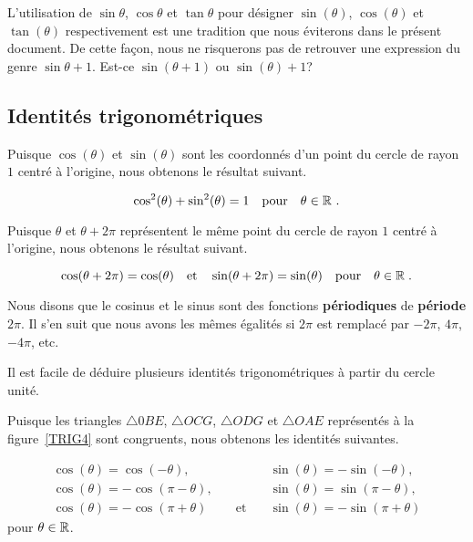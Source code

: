 {\begin{rmk}
L'utilisation de $\sin \theta$, $\cos \theta$ et $\tan \theta$ pour
désigner $\sin(\theta)$, $\cos(\theta)$ et $\tan(\theta)$
respectivement est une tradition que nous éviterons dans le présent
document.  De cette façon, nous ne risquerons pas de retrouver une
expression du genre $\sin \theta + 1$. Est-ce $\sin(\theta+1)$ ou
$\sin(\theta) + 1$?
\end{rmk}

\subsection{Identités trigonométriques}

Puisque $\cos(\theta)$ et $\sin(\theta)$ sont les coordonnés d'un
point du cercle de rayon $1$ centré à l'origine, nous obtenons le
résultat suivant.

\begin{prop}
\[
\cos^2(\theta) + \sin^2(\theta) = 1 \quad \text{pour} \quad \theta \in
\mathbb{R} \ .
\]
\end{prop}

Puisque $\theta$ et $\theta+2\pi$ représentent le même point du cercle
de rayon $1$ centré à l'origine, nous obtenons le résultat suivant.

\begin{prop}
\[
\cos(\theta + 2\pi) = \cos(\theta) \quad \text{et} \quad
\sin(\theta + 2\pi) = \sin(\theta) \quad \text{pour} \quad \theta \in \mathbb{R} \; .
\]
\end{prop}

Nous disons que le cosinus et le sinus sont des fonctions
{\bfseries périodiques} de {\bfseries période} $2\pi$.
Il s'en suit que nous avons les mêmes égalités si $2\pi$ est remplacé
par $-2\pi$, $4\pi$, $-4\pi$, etc.

Il est facile de déduire plusieurs identités trigonométriques à partir
du cercle unité.

Puisque les triangles $\triangle 0BE$, $\triangle OCG$,
$\triangle ODG$ et $\triangle OAE$ représentés à la figure~\ref{TRIG4} sont
congruents, nous obtenons les identités suivantes.

\begin{prop}
\[
\begin{array}{lcl}
\cos(\theta) = \cos(-\theta) ,&& \sin(\theta) = -\sin(-\theta), \\
\cos(\theta) = -\cos(\pi - \theta) ,&& \sin(\theta) = \sin(\pi - \theta),\\
\cos(\theta) = -\cos(\pi + \theta) & \quad\text{et}\quad &
\sin(\theta) = -\sin(\pi+\theta)
\end{array}
\]
pour $\theta \in \mathbb{R}$. \label{fonct_ident_trigsA}
\end{prop}

}
